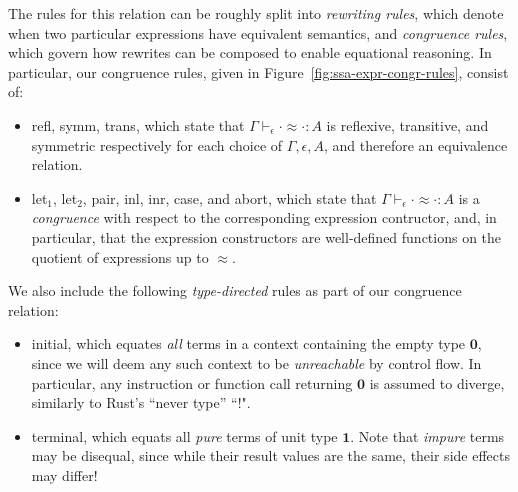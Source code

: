 \documentclass[acmsmall,screen,review]{acmart}
\newcommand{\mb}[1]{\ensuremath{\mathbf{#1}}}
\newcommand{\teqv}{\approx}
\newcommand{\tmeq}[5]{#1 \vdash_{#2} #3 \teqv #4 : {#5}}
\newcommand{\brle}[1]{{\textsf{#1}}}
\begin{document}
The rules for this relation can be roughly split into \emph{rewriting rules}, which denote when two
particular expressions have equivalent semantics, and \emph{congruence rules}, which govern how
rewrites can be composed to enable equational reasoning. In particular, our congruence rules, given
in Figure~\ref{fig:ssa-expr-congr-rules}, consist of:
\begin{itemize}
  \item \brle{refl}, \brle{symm}, \brle{trans}, which state that
  $\tmeq{\Gamma}{\epsilon}{\cdot}{\cdot}{A}$ is reflexive, transitive, and symmetric respectively
  for each choice of $\Gamma, \epsilon, A$, and therefore an equivalence relation.
  \item \brle{let$_1$}, \brle{let$_2$}, \brle{pair}, \brle{inl}, \brle{inr}, \brle{case}, and
  \brle{abort}, which state that $\tmeq{\Gamma}{\epsilon}{\cdot}{\cdot}{A}$ is a \emph{congruence}
  with respect to the corresponding expression contructor, and, in particular, that the expression
  constructors are well-defined functions on the quotient of expressions up to $\teqv$.
\end{itemize} 
We also include the following \emph{type-directed} rules as part of our congruence relation:
\begin{itemize}
  \item \brle{initial}, which equates \emph{all} terms in a context containing the empty type
  $\mb{0}$, since we will deem any such context to be \emph{unreachable} by control flow. In
  particular, any instruction or function call returning $\mb{0}$ is assumed to diverge, similarly
  to Rust's ``never type'' ``$!$".
  \item \brle{terminal}, which equats all \emph{pure} terms of unit type $\mb{1}$. Note that
  \emph{impure} terms may be disequal, since while their result values are the same, their side
  effects may differ!
\end{itemize}
\end{document}
